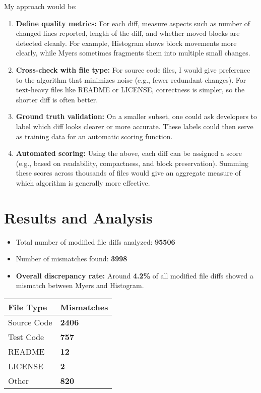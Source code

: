 \documentclass[10pt,a4paper]{report}
\begin{document}
My approach would be:
\begin{enumerate}[itemsep=0pt, topsep=0pt]
    \item \textbf{Define quality metrics:} For each diff, measure aspects such as number of changed lines reported, length of the diff, and whether moved blocks are detected cleanly. For example, Histogram shows block movements more clearly, while Myers sometimes fragments them into multiple small changes.

    \item \textbf{Cross-check with file type:} For source code files, I would give preference to the algorithm that minimizes noise (e.g., fewer redundant changes). For text-heavy files like README or LICENSE, correctness is simpler, so the shorter diff is often better.

    \item \textbf{Ground truth validation:} On a smaller subset, one could ask developers to label which diff looks clearer or more accurate. These labels could then serve as training data for an automatic scoring function.

    \item \textbf{Automated scoring:} Using the above, each diff can be assigned a score (e.g., based on readability, compactness, and block preservation). Summing these scores across thousands of files would give an aggregate measure of which algorithm is generally more effective.
\end{enumerate}

\newpage
\section{Results and Analysis}

\begin{itemize}[itemsep=0.2em, topsep=0pt]
    \item Total number of modified file diffs analyzed: \textbf{95506}
    \item Number of mismatches found: \textbf{3998}
    \item \textbf{Overall discrepancy rate:} Around \textbf{4.2\%} of all modified file diffs showed a mismatch between Myers and Histogram.
\end{itemize}

\begin{table}[h!]
\centering
\begin{tabular}{|l|l|}
\hline
File Type & Mismatches \\
\hline
Source Code & \textbf{2406} \\
Test Code & \textbf{757} \\
README & \textbf{12} \\
LICENSE & \textbf{2} \\
Other & \textbf{820} \\
\hline
\end{tabular}
\end{table}
\end{document}
